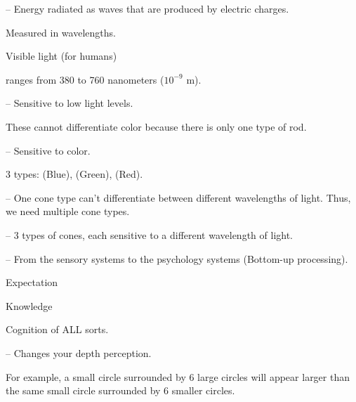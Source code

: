 \begin{coloredlist}
    \item {} -- Energy radiated as waves that are produced by electric charges.
    \begin{coloredlist}
        \item Measured in wavelengths.
        \item Visible light (for humans)
        \begin{coloredlist}
            \item ranges from 380 to 760 nanometers (\(10^{-9}\) m).
        \end{coloredlist}
    \end{coloredlist}
    \item {} -- Sensitive to low light levels.
    \begin{coloredlist}
        \item These cannot differentiate color because there is only one type of rod.
    \end{coloredlist}
    \item {} -- Sensitive to color.
    \begin{coloredlist}
        \item 3 types:  (Blue),  (Green),  (Red).
    \end{coloredlist}
    \item {} -- One cone type can't differentiate between different wavelengths of light. Thus, we need multiple cone types.
    \item {} -- 3 types of cones, each sensitive to a different wavelength of light.
    \item {} -- From the sensory systems to the psychology systems (Bottom-up processing).
    \item {}
    \begin{coloredlist}
        \item Expectation
        \item Knowledge
        \item Cognition of ALL sorts.
    \end{coloredlist}
    \item {} -- Changes your depth perception.
    \begin{coloredlist}
        \item For example, a small circle surrounded by 6 large circles will appear larger than the same small circle surrounded by 6 smaller circles.
    \end{coloredlist}
\end{coloredlist}

